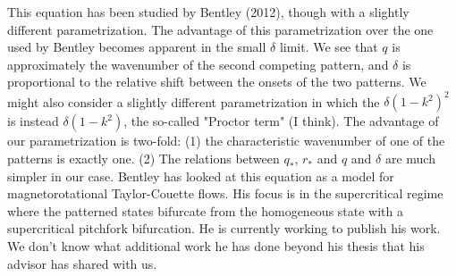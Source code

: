 \documentclass[../main/FlatMarginalStability.tex]{subfiles}
\begin{document}
This equation has been studied by Bentley (2012), though with a slightly different parametrization.  The advantage of this parametrization over the one used by Bentley becomes apparent in the small $\delta$ limit.  We see that $q$ is approximately the wavenumber of the second competing pattern, and $\delta$ is proportional to the relative shift between the onsets of the two patterns.   We might also consider a slightly different parametrization in which the $\delta (1-k^2)^2$ is instead $\delta (1-k^2)$, the so-called "Proctor term" (I think).  The advantage of our parametrization is two-fold: (1) the characteristic wavenumber of one of the patterns is exactly one. (2) The relations between $q_*$, $r_*$ and $q$ and $\delta$ are much simpler in our case.    Bentley has looked at this equation as a model for magnetorotational Taylor-Couette flows.  His focus is in the supercritical regime where the patterned states bifurcate from the homogeneous state with a supercritical pitchfork bifurcation.  He is currently working to publish his work.  We don't know what additional work he has done beyond his thesis that his advisor has shared with us.
\end{document}
